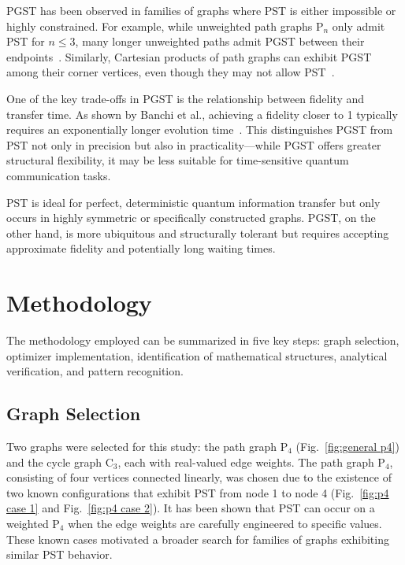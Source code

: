 \documentclass[reprint, aps, 12pt, floatfix]{revtex4-2}
\begin{document}
PGST has been observed in families of graphs where PST is either impossible or highly constrained. For example, while unweighted path graphs P$_n$ only admit PST for $n\leq3$, many longer unweighted paths admit PGST between their endpoints~\cite{GodsilChris2012Nnoc}. Similarly, Cartesian products of path graphs can exhibit PGST among their corner vertices, even though they may not allow PST~\cite{chan2023prettygoodstatetransfer}.

One of the key trade-offs in PGST is the relationship between fidelity and transfer time. As shown by Banchi et al., achieving a fidelity closer to 1 typically requires an exponentially longer evolution time~\cite{10.1063/1.4978327}. This distinguishes PGST from PST not only in precision but also in practicality—while PGST offers greater structural flexibility, it may be less suitable for time-sensitive quantum communication tasks.

PST is ideal for perfect, deterministic quantum information transfer but only occurs in highly symmetric or specifically constructed graphs. PGST, on the other hand, is more ubiquitous and structurally tolerant but requires accepting approximate fidelity and potentially long waiting times.

\section{Methodology}
The methodology employed can be summarized in five key steps: graph selection, optimizer implementation, identification of mathematical structures, analytical verification, and pattern recognition.

\subsection{Graph Selection}
Two graphs were selected for this study: the path graph P$_4$ (Fig.~\ref{fig:general p4}) and the cycle graph C$_3$, each with real-valued edge weights. The path graph P$_4$, consisting of four vertices connected linearly, was chosen due to the existence of two known configurations that exhibit PST from node 1 to node 4 (Fig.~\ref{fig:p4 case 1} and Fig.~\ref{fig:p4 case 2}). It has been shown that PST can occur on a weighted P$_4$ when the edge weights are carefully engineered to specific values. These known cases motivated a broader search for families of graphs exhibiting similar PST behavior.
\end{document}
